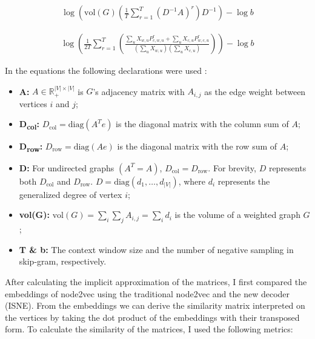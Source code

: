 \begin{align}
\label{dw_M}
\log \left( {\text{vol}(G)} \left( \frac{1}{T} \sum_{r=1}^{T} \left( D^{-1}A \right)^r \right) D^{-1} \right) - \log b
\end{align}

\begin{align}
\label{n2v_M}
\log \left( \frac{1}{2T} \sum_{r=1}^{T} \left( \frac{\sum_{u} X_{w,u} P^{r}_{c,w,u} + \sum_{u} X_{c,u} P^{r}_{w,c,u}}{(\sum_{u} X_{w,u})(\sum_{u} X_{c,u})} \right) \right) - \log b
\end{align}

In the equations the following declarations were used \cite{DBLP:journals/corr/abs-1710-02971} \cite{DBLP:journals/corr/YangL15}:

\begin{itemize}
    \item \textbf{A:} $A \in \mathbb{R}_{+}^{|V| \times |V|}$ is $G$'s adjacency matrix with $A_{i,j}$ as the edge weight between vertices $i$ and $j$;
    \item \textbf{D\textsubscript{col}:} $D_{\text{col}} = \text{diag}(A^T e)$ is the diagonal matrix with the column sum of $A$;
    \item \textbf{D\textsubscript{row}:} $D_{\text{row}} = \text{diag}(Ae)$ is the diagonal matrix with the row sum of $A$;
    \item \textbf{D:} For undirected graphs $(A^T = A)$, $D_{\text{col}} = D_{\text{row}}$. For brevity, $D$ represents both $D_{\text{col}}$ and $D_{\text{row}}$. $D = \text{diag}(d_1, \ldots, d_{|V|})$, where $d_i$ represents the generalized degree of vertex $i$;
    \item \textbf{vol(G):} $\text{vol}(G) = \sum_{i} \sum_{j} A_{i,j} = \sum_{i} d_i$ is the volume of a weighted graph $G$;
    \item \textbf{T \& b:} The context window size and the number of negative sampling in skip-gram, respectively.
\end{itemize}

After calculating the implicit approximation of the matrices, I first compared the embeddings of node2vec using the traditional node2vec and the new decoder (ISNE). From the embeddings we can derive the similarity matrix interpreted on the vertices by taking the dot product of the embeddings with their transposed form. To calculate the similarity of the matrices, I used the following metrics:

